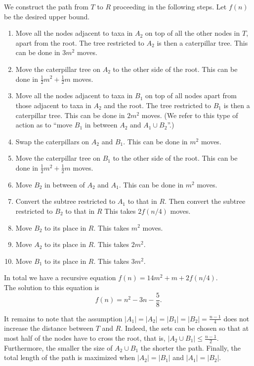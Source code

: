 \documentclass{amsart}
\theoremstyle{definition}
\begin{document}
We construct the path from $T$ to $R$ proceeding in the following steps.
Let $f(n)$ be the desired upper bound.

\begin{enumerate}[(1)]
\item Move all the nodes adjacent to taxa in $A_2$ on top of all the other nodes in $T$, apart from the root.
The tree restricted to $A_2$ is then a caterpillar tree.
This can be done in $3m^2$ moves.

\item Move the caterpillar tree on $A_2$ to the other side of the root.
This can be done in $\frac12 m^2 + \frac12 m$ moves.

\item Move all the nodes adjacent to taxa in $B_1$ on top of all nodes apart from those adjacent to taxa in $A_2$ and the root.
The tree restricted to $B_1$ is then a caterpillar tree.
This can be done in $2m^2$ moves.
(We refer to this type of action as to ``move $B_1$ in between $A_2$ and $A_1 \cup B_2$''.)

\item Swap the caterpillars on $A_2$ and $B_1$.
This can be done in $m^2$ moves.

\item Move the caterpillar tree on $B_1$ to the other side of the root.
This can be done in $\frac12 m^2 + \frac12 m$ moves.

\item Move $B_2$ in between of $A_2$ and $A_1$.
This can be done in $m^2$ moves.

\item Convert the subtree restricted to $A_1$ to that in $R$.
Then convert the subtree restricted to $B_2$ to that in $R$
This takes $2f(n/4)$ moves.

\item Move $B_2$ to its place in $R$.
This takes $m^2$ moves.

\item Move $A_2$ to its place in $R$.
This takes $2m^2$.

\item Move $B_1$ to its place in $R$.
This takes $3m^2$.
\end{enumerate}

In total we have a recursive equation $f(n) = 14m^2 + m + 2 f(n/4)$.\\
The solution to this equation is
\[
f(n) = n^2 - 3n - \frac 58.
\]

It remains to note that the assumption $|A_1| = |A_2| = |B_1| = |B_2| = \frac{n-1}{4}$ does not increase the distance between $T$ and $R$.
Indeed, the sets can be chosen so that at most half of the nodes have to cross the root, that is, $|A_2 \cup B_1| \le \frac{n-1}{2}$.
Furthermore, the smaller the size of $A_2 \cup B_1$ the shorter the path.
Finally, the total length of the path is maximized when $|A_2| = |B_1|$ and $|A_1| = |B_2|$.
\endproof
\end{document}
